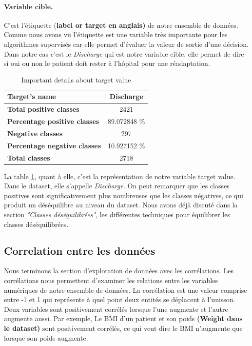 \documentclass[12pt, french]{report}
\begin{document}
\paragraph*{ Variable cible.} C'est l'étiquette (\textbf{label or target en anglais)} de notre ensemble de données. Comme nous avons vu l'étiquette est une variable très importante pour les algorithmes supervisés car elle permet d'évaluer la valeur de sortie d'une décision. Dans notre cas c'est le \textit{Discharge} qui est notre variable cible, elle permet de dire si oui ou non le patient doit rester à l'hôpital pour une réadaptation. \\

\begin{table}[h]
\centering
\begin{tabular}{| l | c |}
\hline
\textbf{Target's name} & Discharge \\
\hline
\textbf{Total positive classes} & 2421 \\
\hline
\textbf{Percentage positive classes} & 89.072848 \% \\
\hline
\textbf{Negative classes} & 297 \\
\hline
\textbf{Percentage negative classes} & 10.927152 \% \\
\hline
\textbf{Total classes} & 2718 \\

\hline
\end{tabular}
\caption{Important details about target value}
\label{tab:target}
\end{table}

La table \ref{tab:target}, quant à elle, c'est la représentation de notre variable target value. Dans le dataset, elle s'appelle \textit{Discharge}. On peut remarquer que les classes positives sont significativement plus nombreuses que les classes négatives, ce qui produit un déséquilibre au niveau du dataset. Nous avons déjà discuté dans la section\textit{ "Classes déséquilibrées"}, les différentes techniques pour équilibrer les classes déséquilibrées.

\subsection{Correlation entre les données}
Nous terminons la section d'exploration de données avec les corrélations. Les corrélations nous permettent d'examiner les relations entre les variables numériques de notre ensemble de données. La corrélation est une valeur comprise entre -1 et 1 qui représente à quel point deux entités se déplacent à l'unisson. Deux variables sont positivement corrélés lorsque l'une augmente et l'autre augmente aussi. Par exemple, Le BMI d'un patient et son poids\textbf{ (Weight dans le dataset)} sont positivement corrélés, ce qui veut dire le BMI n'augmente que lorsque son poids augmente.\\
\end{document}
